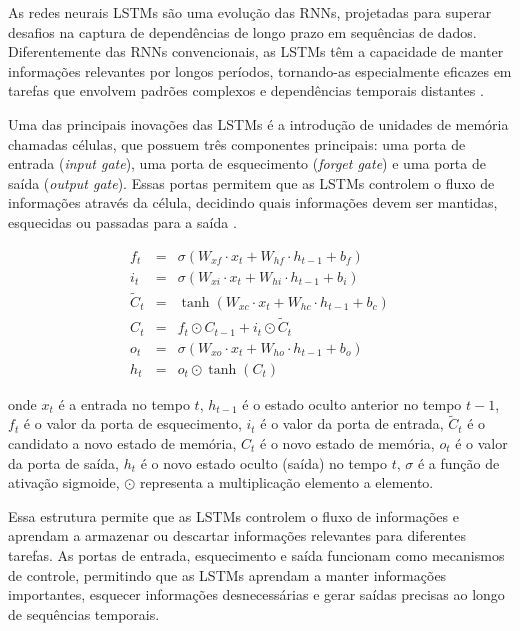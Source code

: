  As redes neurais LSTMs são uma evolução das RNNs, projetadas para superar desafios na captura de dependências de longo prazo em sequências de dados. Diferentemente das RNNs convencionais, as LSTMs têm a capacidade de manter informações relevantes por longos períodos, tornando-as especialmente eficazes em tarefas que envolvem padrões complexos e dependências temporais distantes \cite{Zhang2021}.
 
 Uma das principais inovações das LSTMs é a introdução de unidades de memória chamadas células, que possuem três componentes principais: uma porta de entrada (\textit{input gate}), uma porta de esquecimento (\textit{forget gate}) e uma porta de saída (\textit{output gate}). Essas portas permitem que as LSTMs controlem o fluxo de informações através da célula, decidindo quais informações devem ser mantidas, esquecidas ou passadas para a saída \cite{Zhang2021}.
  
 \begin{eqnarray}
 	f_t &=& \sigma(W_{xf} \cdot x_t + W_{hf} \cdot h_{t-1} + b_f) \\
 	i_t &=& \sigma(W_{xi} \cdot x_t + W_{hi} \cdot h_{t-1} + b_i) \\
 	\tilde{C}_t &=& \tanh(W_{xc} \cdot x_t + W_{hc} \cdot h_{t-1} + b_c) \\
 	C_t &=& f_t \odot C_{t-1} + i_t \odot \tilde{C}_t \\
 	o_t &=& \sigma(W_{xo} \cdot x_t + W_{ho} \cdot h_{t-1} + b_o) \\
 	h_t &=& o_t \odot \tanh(C_t)
 \end{eqnarray}
 
\noindent onde \(x_t\) é a entrada no tempo \(t\), \(h_{t-1}\) é o estado oculto anterior no tempo \(t-1\), \(f_t\) é o valor da porta de esquecimento, \(i_t\) é o valor da porta de entrada, \(\tilde{C}_t\) é o candidato a novo estado de memória, \(C_t\) é o novo estado de memória, \(o_t\) é o valor da porta de saída, \(h_t\) é o novo estado oculto (saída) no tempo \(t\), \(\sigma\) é a função de ativação sigmoide, \(\odot\) representa a multiplicação elemento a elemento.
 
 Essa estrutura permite que as LSTMs controlem o fluxo de informações e aprendam a armazenar ou descartar informações relevantes para diferentes tarefas. As portas de entrada, esquecimento e saída funcionam como mecanismos de controle, permitindo que as LSTMs aprendam a manter informações importantes, esquecer informações desnecessárias e gerar saídas precisas ao longo de sequências temporais.
 
